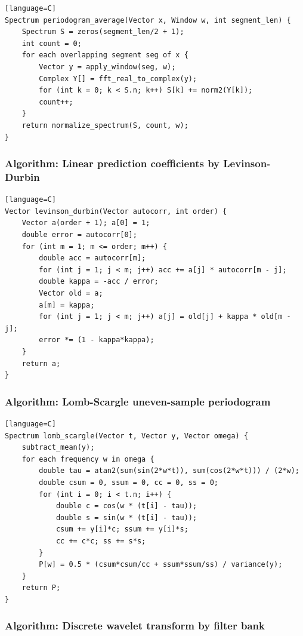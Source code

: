 \documentclass[11pt]{article}
\begin{document}
\begin{verbatim}[language=C]
Spectrum periodogram_average(Vector x, Window w, int segment_len) {
    Spectrum S = zeros(segment_len/2 + 1);
    int count = 0;
    for each overlapping segment seg of x {
        Vector y = apply_window(seg, w);
        Complex Y[] = fft_real_to_complex(y);
        for (int k = 0; k < S.n; k++) S[k] += norm2(Y[k]);
        count++;
    }
    return normalize_spectrum(S, count, w);
}
\end{verbatim}

\subsubsection{Algorithm: Linear prediction coefficients by Levinson-Durbin}\label{algorithm-linear-prediction-coefficients-by-levinson-durbin}

\begin{verbatim}[language=C]
Vector levinson_durbin(Vector autocorr, int order) {
    Vector a(order + 1); a[0] = 1;
    double error = autocorr[0];
    for (int m = 1; m <= order; m++) {
        double acc = autocorr[m];
        for (int j = 1; j < m; j++) acc += a[j] * autocorr[m - j];
        double kappa = -acc / error;
        Vector old = a;
        a[m] = kappa;
        for (int j = 1; j < m; j++) a[j] = old[j] + kappa * old[m - j];
        error *= (1 - kappa*kappa);
    }
    return a;
}
\end{verbatim}

\subsubsection{Algorithm: Lomb-Scargle uneven-sample periodogram}\label{algorithm-lomb-scargle-uneven-sample-periodogram}

\begin{verbatim}[language=C]
Spectrum lomb_scargle(Vector t, Vector y, Vector omega) {
    subtract_mean(y);
    for each frequency w in omega {
        double tau = atan2(sum(sin(2*w*t)), sum(cos(2*w*t))) / (2*w);
        double csum = 0, ssum = 0, cc = 0, ss = 0;
        for (int i = 0; i < t.n; i++) {
            double c = cos(w * (t[i] - tau));
            double s = sin(w * (t[i] - tau));
            csum += y[i]*c; ssum += y[i]*s;
            cc += c*c; ss += s*s;
        }
        P[w] = 0.5 * (csum*csum/cc + ssum*ssum/ss) / variance(y);
    }
    return P;
}
\end{verbatim}

\subsubsection{Algorithm: Discrete wavelet transform by filter bank}\label{algorithm-discrete-wavelet-transform-by-filter-bank}
\end{document}
